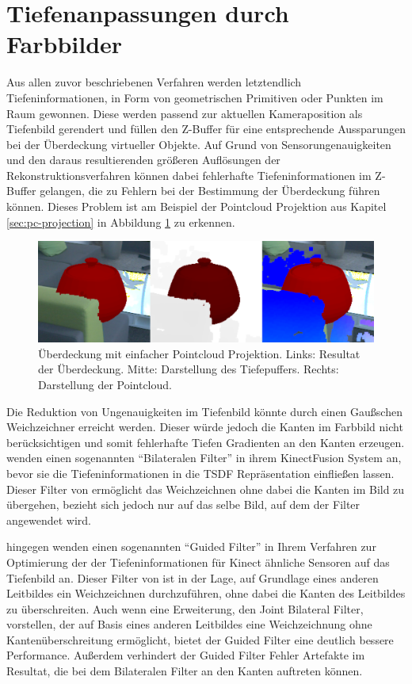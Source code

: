 \section{Tiefenanpassungen durch Farbbilder}

Aus allen zuvor beschriebenen Verfahren werden letztendlich Tiefeninformationen, in Form von geometrischen Primitiven oder Punkten im Raum gewonnen. Diese werden passend zur aktuellen Kameraposition als Tiefenbild gerendert und füllen den Z-Buffer für eine entsprechende Aussparungen bei der Überdeckung virtueller Objekte. Auf Grund von Sensorungenauigkeiten und den daraus resultierenden größeren Auflösungen der Rekonstruktionsverfahren können dabei fehlerhafte Tiefeninformationen im Z-Buffer gelangen, die zu Fehlern bei der Bestimmung der Überdeckung führen können. Dieses Problem ist am Beispiel der Pointcloud Projektion aus Kapitel \ref{sec:pc-projection} in Abbildung \ref{fig:pc-noise} zu erkennen. 

\begin{figure}[h]
  \centering
	\includegraphics[width=1.0\textwidth]{content/images/methods/pc-noise.png} 
  \caption{Überdeckung mit einfacher Pointcloud Projektion. Links: Resultat der Überdeckung. Mitte: Darstellung des Tiefepuffers. Rechts: Darstellung der Pointcloud.}
  \label{fig:pc-noise}
\end{figure}

Die Reduktion von Ungenauigkeiten im Tiefenbild könnte durch einen Gaußschen Weichzeichner erreicht werden. Dieser würde jedoch die Kanten im Farbbild nicht berücksichtigen und somit fehlerhafte Tiefen Gradienten an den Kanten erzeugen. \citet{newcombe2011kinectfusion} wenden einen sogenannten \enquote{Bilateralen Filter} in ihrem KinectFusion System an, bevor sie die Tiefeninformationen in die TSDF Repräsentation einfließen lassen. Dieser Filter von \citet{tomasi1998bilateral} ermöglicht das Weichzeichnen ohne dabei die Kanten im Bild zu übergehen, bezieht sich jedoch nur auf das selbe Bild, auf dem der Filter angewendet wird. 

\citet{liu2012guided} hingegen wenden einen sogenannten \enquote{Guided Filter} in Ihrem Verfahren zur Optimierung der der Tiefeninformationen für Kinect ähnliche Sensoren auf das Tiefenbild an. Dieser Filter von \citet{he2010guided} ist in der Lage, auf Grundlage eines anderen Leitbildes ein Weichzeichnen durchzuführen, ohne dabei die Kanten des Leitbildes zu überschreiten. Auch wenn \citet{petschnigg2004digital} eine Erweiterung, den Joint Bilateral Filter, vorstellen, der auf Basis eines anderen Leitbildes eine Weichzeichnung ohne Kantenüberschreitung ermöglicht, bietet der Guided Filter eine deutlich bessere Performance. Außerdem verhindert der Guided Filter Fehler Artefakte im Resultat, die bei dem Bilateralen Filter an den Kanten auftreten können. \citep{he2010guided} 


